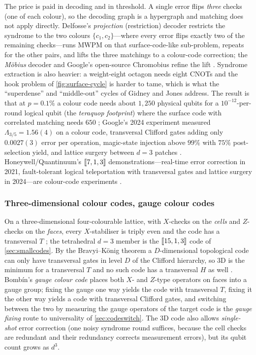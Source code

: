 The price is paid in decoding and in threshold. A single error flips \emph{three} checks (one of each colour), so the decoding graph is a hypergraph and matching does not apply directly. Delfosse's \emph{projection} (restriction) decoder \cite{delfosse14} restricts the syndrome to the two colours $\{c_1,c_2\}$---where every error flips exactly two of the remaining checks---runs MWPM on that surface-code-like sub-problem, repeats for the other pairs, and lifts the three matchings to a colour-code correction; the \emph{M\"obius} decoder and Google's open-source Chromobius refine the lift \cite{gidney23color}. Syndrome extraction is also heavier: a weight-eight octagon needs eight CNOTs and the hook problem of \cref{fig:surface-cycle} is harder to tame, which is what the ``superdense'' and ``middle-out'' cycles of Gidney and Jones address. The result is that at $p=0.1\%$ a colour code needs about $1{,}250$ physical qubits for a $10^{-12}$-per-round logical qubit (the \emph{teraquop footprint}) where the surface code with correlated matching needs $650$ \cite{gidney23color}; Google's 2024 experiment measured $\Lambda_{3/5}=1.56(4)$ on a colour code, transversal Clifford gates adding only $0.0027(3)$ error per operation, magic-state injection above $99\%$ with $75\%$ post-selection yield, and lattice surgery between $d=3$ patches \cite{lacroix24color}. Honeywell/Quantinuum's $[\![7,1,3]\!]$ demonstrations---real-time error correction in 2021, fault-tolerant logical teleportation with transversal gates and lattice surgery in 2024---are colour-code experiments \cite{ryan-anderson21,ryan-anderson24}.

\subsubsection{Three-dimensional colour codes, gauge colour codes}
On a three-dimensional four-colourable lattice, with $X$-checks on the \emph{cells} and $Z$-checks on the \emph{faces}, every $X$-stabiliser is triply even and the code has a transversal $T$ \cite{bombin07,kubica15}; the tetrahedral $d=3$ member is the $[\![15,1,3]\!]$ code of \cref{sec:smallcodes}. By the Bravyi--K\"onig theorem a $D$-dimensional topological code can only have transversal gates in level $D$ of the Clifford hierarchy, so 3D is the minimum for a transversal $T$ and no such code has a transversal $H$ as well \cite{bravyi-koenig13}. Bomb\'in's \emph{gauge colour code} \cite{bombin15} places both $X$- and $Z$-type operators on faces into a gauge group; fixing the gauge one way yields the code with transversal $T$, fixing it the other way yields a code with transversal Clifford gates, and switching between the two by measuring the gauge operators of the target code is the \emph{gauge fixing} route to universality of \cref{sec:codeswitch}. The 3D code also allows \emph{single-shot} error correction (one noisy syndrome round suffices, because the cell checks are redundant and their redundancy corrects measurement errors), but its qubit count grows as $d^3$.

